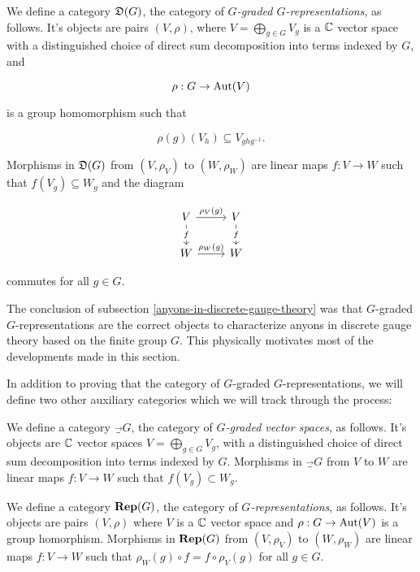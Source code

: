 \begin{defn} We define a category ${\mathfrak D}(G)$, the category of {\em $G$-graded $G$-representations}, as follows. It's objects are pairs $(V,\rho)$, where $V=\bigoplus_{g\in G}V_g$ is a ${\mathbb C}$ vector space with a distinguished choice of direct sum decomposition into terms indexed by $G$, and

$$\rho:G\to \operatorname{Aut}(V)$$

is a group homomorphism such that

$$\rho(g)(V_h)\subseteq V_{ghg^{-1}}.$$

Morphisms in ${\mathfrak D}(G)$ from $(V,\rho_V)$ to $(W,\rho_W)$ are linear maps $f:V\to W$ such that $f(V_g)\subseteq W_g$ and the diagram

\[\begin{tikzcd}
	V & V \\
	W & W
	\arrow["{\rho_V(g)}", from=1-1, to=1-2]
	\arrow["f"{description}, from=1-1, to=2-1]
	\arrow["f"{description}, from=1-2, to=2-2]
	\arrow["{\rho_W(g)}", from=2-1, to=2-2]
\end{tikzcd}\]

commutes for all $g\in G$.
\end{defn}

\begin{rem}
The conclusion of subsection \ref{anyons-in-discrete-gauge-theory} was that $G$-graded $G$-representations are the correct objects to characterize anyons in discrete gauge theory based on the finite group $G$. This physically motivates most of the developments made in this section.
\end{rem}

In addition to proving that the category of $G$-graded $G$-representations, we will define two other auxiliary categories which we will track through the process: 

\begin{defn} We define a category $\Vec_G$, the category of {\em $G$-graded vector spaces}, as follows. It's objects are ${\mathbb C}$ vector spaces $V=\bigoplus_{g\in G}V_g$, with a distinguished choice of direct sum decomposition into terms indexed by $G$. Morphisms in $\Vec_G$  from $V$ to $W$ are linear maps $f:V\to W$ such that $f(V_g)\subset W_g$.
\end{defn}

\begin{defn} We define a category ${\bf Rep}(G)$, the category of {\em $G$-representations}, as follows. It's objects are pairs $(V,\rho)$ where $V$ is a ${\mathbb C}$ vector space and $\rho:G\to\operatorname{Aut}(V)$ is a group homorphism. Morphisms in ${\bf Rep}(G)$ from $(V,\rho_V)$ to $(W,\rho_W)$ are linear maps $f:V\to W$ such that $\rho_W(g)\circ f=f\circ\rho_V(g)$ for all $g\in G$.
\end{defn}

